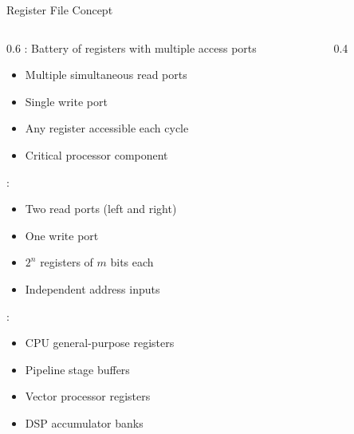 \begin{frame}{Register File Concept}
\begin{columns}
\begin{column}{0.6\textwidth}
: Battery of registers with multiple access ports
\begin{itemize}
\item Multiple simultaneous read ports
\item Single write port
\item Any register accessible each cycle
\item Critical processor component
\end{itemize}
\vspace{0.3cm}
:
\begin{itemize}
\item Two read ports (left and right)
\item One write port
\item $2^n$ registers of $m$ bits each
\item Independent address inputs
\end{itemize}
\vspace{0.3cm}
:
\begin{itemize}
\item CPU general-purpose registers
\item Pipeline stage buffers
\item Vector processor registers
\item DSP accumulator banks
\end{itemize}
\end{column}
\begin{column}{0.4\textwidth}
\begin{center}

\end{center}
\end{column}
\end{columns}
\end{frame}


